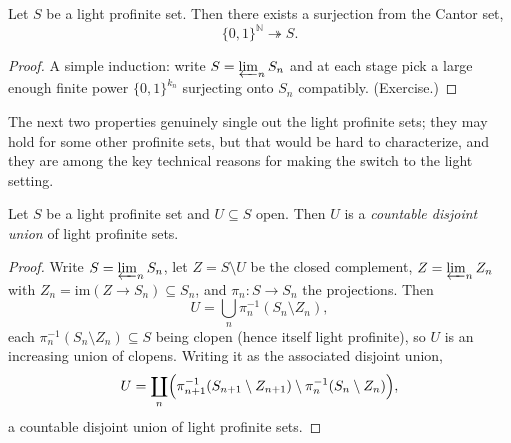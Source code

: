 \begin{proposition}
\label{prop:2:cantor-surjection}
Let $S$ be a light profinite set. Then there exists a surjection from the Cantor
set,
\begin{equation*}
\{0,1\}^{\mathbb{N}}\twoheadrightarrow S.
\end{equation*}
\end{proposition}

\begin{proof}
A simple induction: write $S=\varprojlim_n S_n$ and at each stage pick a large
enough finite power $\{0,1\}^{k_n}$ surjecting onto $S_n$ compatibly. (Exercise.)
\end{proof}

The next two properties genuinely single out the light profinite sets; they may
hold for some other profinite sets, but that would be hard to characterize, and
they are among the key technical reasons for making the switch to the light
setting.

\begin{proposition}
\label{prop:2:open-subsets}
Let $S$ be a light profinite set and $U\subseteq S$ open. Then $U$ is a
\emph{countable disjoint union} of light profinite sets.
\end{proposition}

\begin{proof}
Write $S=\varprojlim_n S_n$, let $Z=S\setminus U$ be the closed complement,
$Z=\varprojlim_n Z_n$ with $Z_n=\mathrm{im}(Z\to S_n)\subseteq S_n$, and
$\pi_n\colon S\to S_n$ the projections. Then
\[
U=\bigcup_n \pi_n^{-1}(S_n\setminus Z_n),
\]
each $\pi_n^{-1}(S_n\setminus Z_n)\subseteq S$ being clopen (hence itself light
profinite), so $U$ is an increasing union of clopens. Writing it as the
associated disjoint union,
\begin{equation*}
U=\coprod_n\Bigl(\pi_{n+1}^{-1}(S_{n+1}\setminus Z_{n+1})\setminus
\pi_n^{-1}(S_n\setminus Z_n)\Bigr),
\end{equation*}
a countable disjoint union of light profinite sets.
\end{proof}

